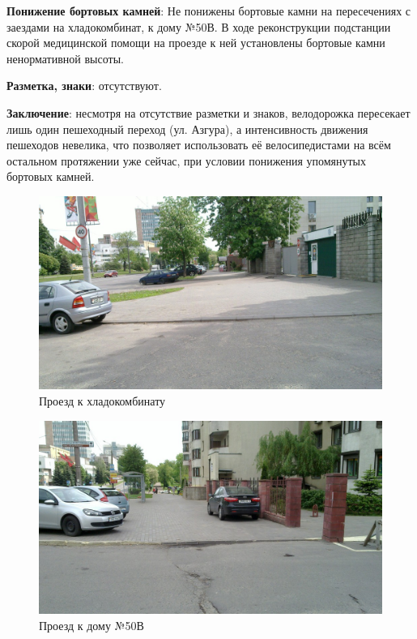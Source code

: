 \documentclass[a4paper,14pt,twoside]{extarticle}
\renewcommand\emph[1]{\textbf{#1}}
\begin{document}
\emph{Понижение бортовых камней}: Не понижены бортовые камни на пересечениях с заездами на хладокомбинат, к дому №50В. В ходе реконструкции подстанции скорой медицинской помощи на проезде к ней установлены бортовые камни ненормативной высоты.

\emph{Разметка, знаки}: отсутствуют.

\emph{Заключение}: несмотря на отсутствие разметки и знаков, велодорожка пересекает лишь один пешеходный переход (ул. Азгура), а интенсивность движения пешеходов невелика, что позволяет использовать её велосипедистами на всём остальном протяжении уже сейчас, при условии понижения упомянутых бортовых камней.

\begin{figure}[h!]
    \centering
    \includegraphics[width=\textwidth]{Pictures/1000000000000A00000005A0A3C4B935.jpg}
    \caption{Проезд к хладокомбинату}
\end{figure}

\begin{figure}[h!]
    \centering
    \includegraphics[width=\textwidth]{Pictures/1000000000000A00000005A08E05568F.jpg}
    \caption{Проезд к дому №50В}
\end{figure}
\end{document}
